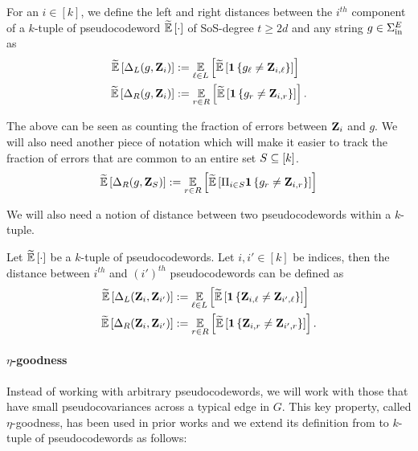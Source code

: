 \begin{definition}
	For an $i\in [k]$, we define the left and right distances between the $i^{th}$ component of a $k$-tuple of pseudocodeword $\tildeEx{\cdot}$ of SoS-degree $t\geq 2d$ and any string $g \in \Sigma_{\mathrm{in}}^E$ as
	\begin{align*}
		\tildeEx{\Delta_L(g, \zee_i)} &\defeq \Ex{\li \in L}{\tildeEx{\indi{g_{\li} \neq \zee_{i, \li}}}} \\
		\tildeEx{\Delta_R(g,\zee_i)} &\defeq \Ex{\ri\in R}{\tildeEx{\indi{g_{\ri} \neq \zee_{i, \ri}}}}.
	\end{align*}
\end{definition}

The above can be seen as counting the fraction of errors between ${ \mathbf{Z} }_i$ and $g$. We will also need another piece of notation which will make it easier to track the fraction of errors that are common to an entire set $S\subseteq [k]$.
\begin{align*}
	\tildeEx{\Delta_R(g,\zee_S)} \defeq \Ex{\ri \in R}{\tildeEx{\Pi_{i\in S} \indi{g_{\ri} \neq \zee_{i,\ri}}}}
\end{align*}

We will also need a notion of distance between two pseudocodewords within a $k$-tuple.
\begin{definition}
Let $\tildeEx{\cdot}$ be a $k$-tuple of pseudocodewords. Let $i,i' \in [k]$ be indices, then the distance between $i^{th}$ and $(i')^{th}$ pseudocodewords can be defined as
\begin{align*}
		\tildeEx{\Delta_L(\zee_i, \zee_{i'})} &\defeq \Ex{\li \in L}{\tildeEx{\indi{\zee_{i, \li} \neq \zee_{i', \li}}}} \\
		\tildeEx{\Delta_R(\zee_i,\zee_{i'})} &\defeq \Ex{\ri\in R}{\tildeEx{\indi{\zee_{i,\ri} \neq \zee_{i', \ri}}}}.
	\end{align*}
\end{definition}

\paragraph{$\eta$-goodness} Instead of working with arbitrary pseudocodewords, we will work with those  that have small pseudocovariances across a typical edge in $G$. This key property, called $\eta$-goodness, has been used in prior works and we extend its definition from \cite{JST23} to $k$-tuple of pseudocodewords as follows:

